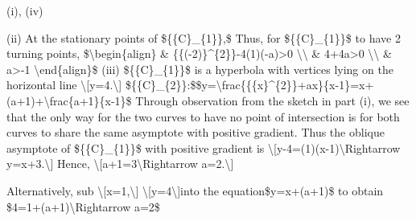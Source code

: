 \item {}

(i), (iv) 

(ii) At the stationary points of \$\{\{C\}\_\{1\}\},\$ Thus, for \$\{\{C\}\_\{1\}\}\$
to have 2 turning points, \$\textbackslash begin\{align\} \& \{\{(-2)\}\textasciicircum\{2\}\}-4(1)(-a)>0
\textbackslash\textbackslash{} \& 4+4a>0 \textbackslash\textbackslash{}
\& a>-1 \textbackslash end\{align\}\$ (iii) \$\{\{C\}\_\{1\}\}\$
is a hyperbola with vertices lying on the horizontal line \textbackslash{[}y=4.\textbackslash{]}
\$\{\{C\}\_\{2\}\}:\$\$y=\textbackslash frac\{\{\{x\}\textasciicircum\{2\}\}+ax\}\{x-1\}=x+(a+1)+\textbackslash frac\{a+1\}\{x-1\}\$
Through observation from the sketch in part (i), we see that the only
way for the two curves to have no point of intersection is for both
curves to share the same asymptote with positive gradient. Thus the
oblique asymptote of \$\{\{C\}\_\{1\}\}\$ with positive gradient is
\textbackslash{[}y-4=(1)(x-1)\textbackslash Rightarrow y=x+3.\textbackslash{]}
Hence, \textbackslash{[}a+1=3\textbackslash Rightarrow a=2.\textbackslash{]}

Alternatively, sub \textbackslash{[}x=1,\textbackslash{]} \textbackslash{[}y=4\textbackslash{]}into
the equation\$y=x+(a+1)\$ to obtain \$4=1+(a+1)\textbackslash Rightarrow
a=2\$